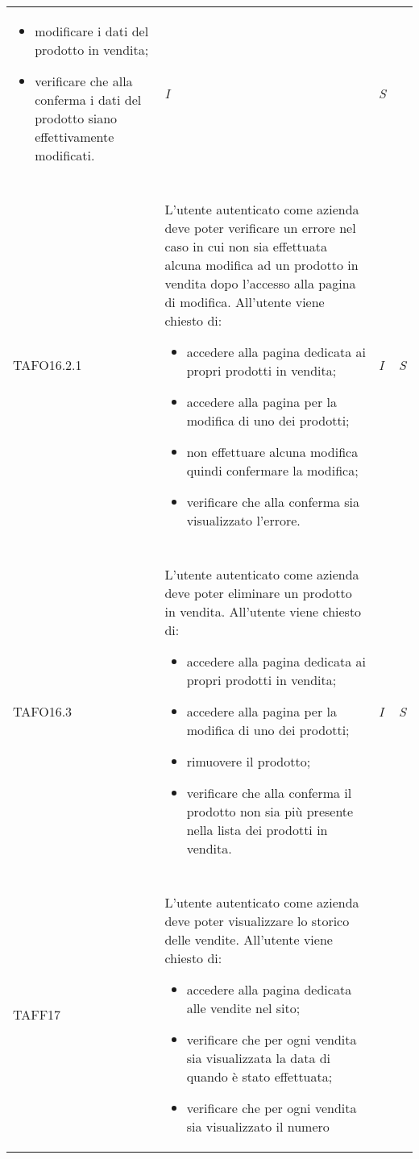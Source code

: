 \begin{longtable}{ >{\centering}p{} >{}p{}
			>{\centering}p{} >{\centering}p{}}
\begin{itemize}
		 	\item modificare i dati del prodotto in vendita;
		 	\item verificare che alla conferma i dati del prodotto siano effettivamente
		 	modificati.
		 \end{itemize} & \textit{I} & \textit{S}\\ \tabularnewline
\hypertarget{TAFO16.2.1}{TAFO16.2.1} & L'utente autenticato come azienda deve poter verificare un errore nel caso
		 in cui non sia effettuata alcuna modifica ad un prodotto in vendita dopo
		 l'accesso alla pagina di modifica. All'utente viene chiesto di:
		 \begin{itemize}
		 	\item accedere alla pagina dedicata ai propri prodotti in vendita;
		 	\item accedere alla pagina per la modifica di uno dei prodotti;
		 	\item non effettuare alcuna modifica quindi confermare la modifica;
		 	\item verificare che alla conferma sia visualizzato l'errore.
		 \end{itemize} & \textit{I} & \textit{S}\\ \tabularnewline
\hypertarget{TAFO16.3}{TAFO16.3} & L'utente autenticato come azienda deve poter eliminare
		 un prodotto in vendita. All'utente viene chiesto di:
		 \begin{itemize}
		 	\item accedere alla pagina dedicata ai propri prodotti in vendita;
		 	\item accedere alla pagina per la modifica di uno dei prodotti;
		 	\item rimuovere il prodotto;
		 	\item verificare che alla conferma il prodotto non sia più presente nella
		 	lista dei prodotti in vendita.
		 \end{itemize} & \textit{I} & \textit{S}\\ \tabularnewline
\hypertarget{TAFF17}{TAFF17} & L'utente autenticato come azienda deve poter visualizzare lo storico delle
		 vendite. All'utente viene chiesto di:
		 \begin{itemize}
		 	\item accedere alla pagina dedicata alle vendite nel sito;
		 	\item verificare che per ogni vendita sia visualizzata la data di quando
		 	è stato effettuata;
		 	\item verificare che per ogni vendita sia visualizzato il numero

\end{itemize}
\end{longtable}
